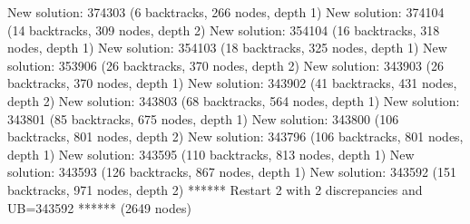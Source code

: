\begin{enumerate}
{\begin{DoxyCode}
New solution: 374303 (6 backtracks, 266 nodes, depth 1)
New solution: 374104 (14 backtracks, 309 nodes, depth 2)
New solution: 354104 (16 backtracks, 318 nodes, depth 1)
New solution: 354103 (18 backtracks, 325 nodes, depth 1)
New solution: 353906 (26 backtracks, 370 nodes, depth 2)
New solution: 343903 (26 backtracks, 370 nodes, depth 1)
New solution: 343902 (41 backtracks, 431 nodes, depth 2)
New solution: 343803 (68 backtracks, 564 nodes, depth 1)
New solution: 343801 (85 backtracks, 675 nodes, depth 1)
New solution: 343800 (106 backtracks, 801 nodes, depth 2)
New solution: 343796 (106 backtracks, 801 nodes, depth 1)
New solution: 343595 (110 backtracks, 813 nodes, depth 1)
New solution: 343593 (126 backtracks, 867 nodes, depth 1)
New solution: 343592 (151 backtracks, 971 nodes, depth 2)
****** Restart 2 with 2 discrepancies and UB=343592 ****** (2649 nodes)


\end{DoxyCode}}
\end{enumerate}
